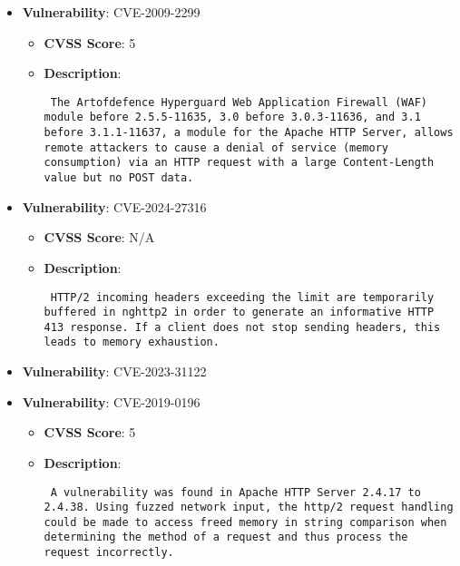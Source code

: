 \documentclass{article}
\begin{document}
\begin{itemize}
        \item \textbf{Vulnerability}: CVE-2009-2299
        \begin{itemize}
            \item \textbf{CVSS Score}:  5 
            \item \textbf{Description}: \parbox{\linewidth}{\texttt{ The Artofdefence Hyperguard Web Application Firewall (WAF) module before 2.5.5-11635, 3.0 before 3.0.3-11636, and 3.1 before 3.1.1-11637, a module for the Apache HTTP Server, allows remote attackers to cause a denial of service (memory consumption) via an HTTP request with a large Content-Length value but no POST data. }}
        \end{itemize}
    
        \item \textbf{Vulnerability}: CVE-2024-27316
        \begin{itemize}
            \item \textbf{CVSS Score}:  N/A 
            \item \textbf{Description}: \parbox{\linewidth}{\texttt{ HTTP/2 incoming headers exceeding the limit are temporarily buffered in nghttp2 in order to generate an informative HTTP 413 response. If a client does not stop sending headers, this leads to memory exhaustion. }}
        \end{itemize}
    
        \item \textbf{Vulnerability}: CVE-2023-31122
    
        \item \textbf{Vulnerability}: CVE-2019-0196
        \begin{itemize}
            \item \textbf{CVSS Score}:  5 
            \item \textbf{Description}: \parbox{\linewidth}{\texttt{ A vulnerability was found in Apache HTTP Server 2.4.17 to 2.4.38. Using fuzzed network input, the http/2 request handling could be made to access freed memory in string comparison when determining the method of a request and thus process the request incorrectly. }}
        \end{itemize}
    

\end{itemize}
\end{document}
